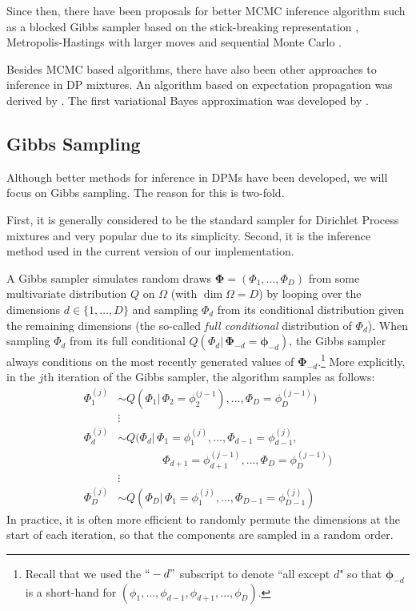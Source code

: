 \documentclass[final,3p,times,twocolumn]{elsarticle}
\let\bs\boldsymbol
\begin{document}
Since then, there have been proposals for better MCMC inference algorithm such as a blocked Gibbs sampler based on the stick-breaking representation \cite{ishwaran2001}, Metropolis-Hastings with larger moves \cite{jain2004} and sequential Monte Carlo \cite{fearnhead2004}.

Besides MCMC based algorithms, there have also been other approaches to inference in DP mixtures.
An algorithm based on expectation propagation was derived by \cite{minka2003}.
The first variational Bayes approximation was developed by \cite{blei2006}.

\subsection{Gibbs Sampling}
Although better methods for inference in DPMs have been developed, we will focus on Gibbs sampling.
The reason for this is two-fold.

First, it is generally considered to be the standard sampler for Dirichlet Process mixtures and very popular due to its simplicity.
Second, it is the inference method used in the current version of our implementation.

A Gibbs sampler simulates random draws $\bs \Phi = (\Phi_1,\dots,\Phi_D)$ from some multivariate distribution $Q$ on $\Omega$ (with $\dim\Omega = D$) by looping over the dimensions $d \in \{1,\dots,D\}$ and sampling $\Phi_d$ from its conditional distribution given the remaining dimensions (the so-called \emph{full conditional} distribution of $\Phi_d$).
When sampling $\Phi_d$ from its full conditional $Q(\Phi_d|\,\bs\Phi_{-d} = \bs \phi_{-d})$, the Gibbs sampler always conditions on the most recently generated values of $\bs \Phi_{-d}$.\footnote{Recall that we used the $``-d"$ subscript to denote ``all except $d$" so that $\bs \phi_{-d}$ is a short-hand for $(\phi_1,\dots,\phi_{d-1},\phi_{d+1},\dots,\phi_{D})$.}
More explicitly, in the $j$th iteration of the Gibbs sampler, the algorithm samples as follows:
\begin{equation*}
\begin{split}
\Phi_1^{(j)} &\sim Q(\Phi_1|\,\Phi_2 = \phi_2^{(j-1}),\dots,\Phi_D = \phi_D^{(j-1)})\\
&\vdots\\
\Phi_d^{(j)} &\sim Q(\Phi_d|\,\Phi_1 = \phi_1^{(j)},\dots,\Phi_{d-1}=\phi_{d-1}^{(j)},\\
&\qquad\qquad \Phi_{d+1}=\phi_{d+1}^{(j-1)},\dots,\Phi_D=\phi_D^{(j-1)})\\
&\vdots\\
\Phi_D^{(j)} &\sim Q(\Phi_D|\,\Phi_1=\phi_1^{(j)},\dots,\Phi_{D-1}=\phi_{D-1}^{(j)})
\end{split}
\end{equation*}
In practice, it is often more efficient to randomly permute the dimensions at the start of each iteration, so that the components are sampled in a random order.
\end{document}
